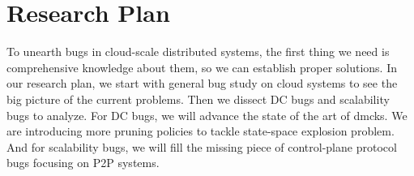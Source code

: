 \chapter{Research Plan}
\label{chp-plan}

To unearth bugs in cloud-scale distributed systems, the first thing we need is
comprehensive knowledge about them, so we can establish proper solutions. In our
research plan, we start with general bug study on cloud systems to see the big
picture of the current problems. Then we dissect DC bugs and scalability bugs to
analyze.
%
For DC bugs, we will advance the state of the art of dmcks. We are introducing 
more pruning policies to tackle state-space explosion problem. And for
scalability bugs, we will fill the missing piece of control-plane protocol bugs
focusing on P2P systems.






